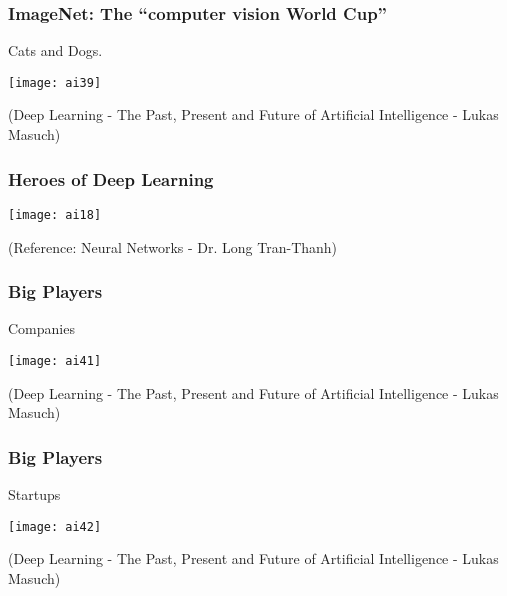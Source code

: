 \begin{frame}[fragile]\frametitle{ImageNet: The ``computer vision World Cup''}
Cats and Dogs.
\begin{center}
\texttt{[image: ai39]}
\end{center}
{\tiny (Deep Learning - The Past, Present and Future of Artificial Intelligence - Lukas Masuch)}
\end{frame}



\begin{frame}[fragile] \frametitle{Heroes of Deep Learning}

\begin{center}
\texttt{[image: ai18]}
\end{center}

\tiny{(Reference: Neural Networks - Dr. Long Tran-Thanh)}
\end{frame}


\begin{frame}[fragile]\frametitle{Big Players}
Companies
\begin{center}
\texttt{[image: ai41]}
\end{center}
{\tiny (Deep Learning - The Past, Present and Future of Artificial Intelligence - Lukas Masuch)}
\end{frame}

\begin{frame}[fragile]\frametitle{Big Players}
Startups
\begin{center}
\texttt{[image: ai42]}
\end{center}
{\tiny (Deep Learning - The Past, Present and Future of Artificial Intelligence - Lukas Masuch)}
\end{frame}
